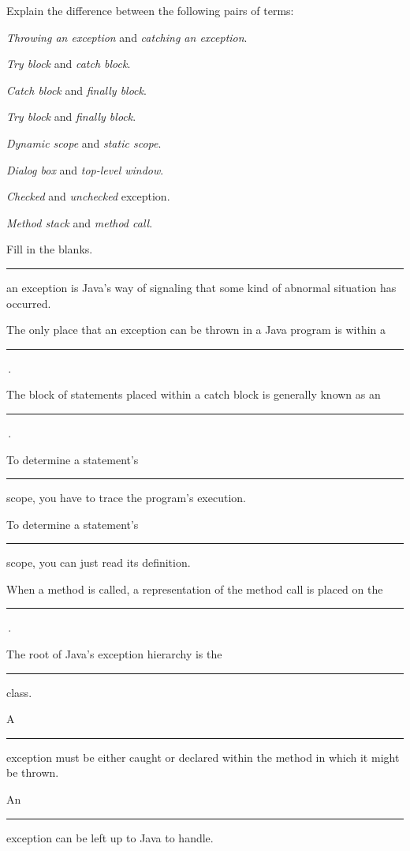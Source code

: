 \begin{EXRtwo}
\item  Explain the difference between the following pairs of terms:
\begin{EXRtwoLL}
\item  {\it Throwing an exception} and {\it catching an exception}.
\item  {\it Try block} and {\it catch block}.
\item  {\it Catch block} and {\it finally block}.
\item  {\it Try block} and {\it finally block}.
\item  {\it Dynamic scope} and {\it static scope}.
\item  {\it Dialog box} and {\it top-level window}.
\item  {\it Checked} and {\it unchecked} exception.
\item  {\it Method stack} and {\it method call}.
\end{EXRtwoLL}

\item  Fill in the blanks.
\begin{EXRtwoLL}\baselineskip=14pt
\item  \rule{40pt}{0.5pt} an exception is Java's way of signaling
that some kind of abnormal situation has occurred.
\item  The only place that an exception can be thrown in
a Java program is within a \rule{40pt}{0.5pt}\,.
\item  The block of statements placed within a catch block is generally
known as an  \rule{40pt}{0.5pt}\,.
\item  To determine a statement's \rule{40pt}{0.5pt} scope, you have to trace
the program's execution.
\item  To determine a statement's \rule{40pt}{0.5pt} scope, you can just
read its definition.
\item  When a method is called, a representation of the method
call is placed on the \rule{40pt}{0.5pt}\,.
\item  The root of Java's exception hierarchy is
the \rule{40pt}{0.5pt} class.
\item  A  \rule{40pt}{0.5pt} exception must be either caught or declared
within the method in which it might be thrown.
\nopagebreak[4]\item  An \rule{40pt}{0.5pt} exception can be left up to Java to handle.
\end{EXRtwoLL}\baselineskip=11pt


\end{EXRtwo}
